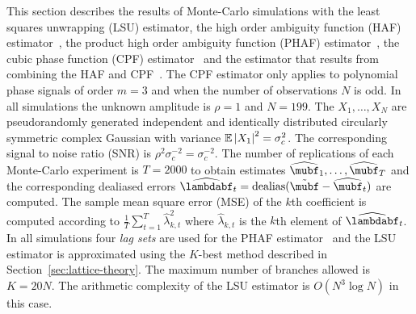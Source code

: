 \documentclass[journal]{IEEEtran}
\begin{document}

This section describes the results of Monte-Carlo simulations with the least squares unwrapping (LSU) estimator, the high order ambiguity function (HAF) estimator~\cite{Peleg_DPT_1995}, the product high order ambiguity function (PHAF) estimator~\cite{Barbarossa_PHAF_1998}, the cubic phase function (CPF) estimator~\cite{Oshea_cpf_2004} and the estimator that results from combining the HAF and CPF~\cite{Djurovic_haf_cpf_2012}.  The CPF estimator only applies to polynomial phase signals of order $m=3$ and when the number of observations $N$ is odd.  In all simulations the unknown amplitude is $\rho = 1$ and $N = 199$.  The $X_1, \dots, X_N$ are pseudorandomly generated independent and identically distributed circularly symmetric complex Gaussian with variance ${\mathbb E}\left\vert X_1 \right\vert^2 = \sigma_c^2$.  The corresponding signal to noise ratio (SNR) is $\rho^2 \sigma_c^{-2} = \sigma_c^{-2}$.  The number of replications of each Monte-Carlo experiment is $T = 2000$ to obtain estimates $\widehat{\mubf}_1, \dots, \widehat{\mubf}_T$ and the corresponding dealiased errors $\widehat{\lambdabf}_t = \dealias(\tilde{\mubf} - \widehat{\mubf}_t)$ are computed.  The sample mean square error (MSE) of the $k$th coefficient is computed according to $\tfrac{1}{T}\sum_{t=1}^T \widehat{\lambda}_{k,t}^2$ where $\widehat{\lambda}_{k,t}$ is the $k$th element of $\widehat{\lambdabf}_t$.  In all simulations four \emph{lag sets} are used for the PHAF estimator~\cite{Barbarossa_PHAF_1998} and the LSU estimator is approximated using the $K$-best method described in Section~\ref{sec:lattice-theory}.  The maximum number of branches allowed is $K=20N$.  The arithmetic complexity of the LSU estimator is $O(N^3\log N)$ in this case.
\end{document}
